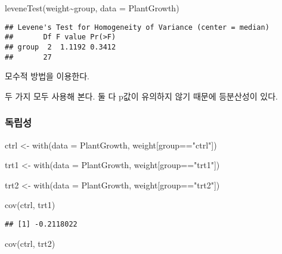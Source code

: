 \documentclass[
]{article}
\newenvironment{Shaded}{\begin{snugshade}}{\end{snugshade}}
\newcommand{\AttributeTok}[1]{\textcolor[rgb]{0.77,0.63,0.00}{#1}}
\newcommand{\FunctionTok}[1]{\textcolor[rgb]{0.00,0.00,0.00}{#1}}
\newcommand{\NormalTok}[1]{#1}
\newcommand{\OtherTok}[1]{\textcolor[rgb]{0.56,0.35,0.01}{#1}}
\newcommand{\SpecialCharTok}[1]{\textcolor[rgb]{0.00,0.00,0.00}{#1}}
\newcommand{\StringTok}[1]{\textcolor[rgb]{0.31,0.60,0.02}{#1}}
\begin{document}
\begin{Shaded}
\begin{Highlighting}[]
\FunctionTok{leveneTest}\NormalTok{(weight}\SpecialCharTok{\textasciitilde{}}\NormalTok{group, }\AttributeTok{data =}\NormalTok{ PlantGrowth)}
\end{Highlighting}
\end{Shaded}

\begin{verbatim}
## Levene's Test for Homogeneity of Variance (center = median)
##       Df F value Pr(>F)
## group  2  1.1192 0.3412
##       27
\end{verbatim}

모수적 방법을 이용한다.

두 가지 모두 사용해 본다. 둘 다 p값이 유의하지 않기 때문에 등분산성이 있다.

\hypertarget{uxb3c5uxb9bduxc131}{%
\subsubsection{독립성}\label{uxb3c5uxb9bduxc131}}

\begin{Shaded}
\begin{Highlighting}[]
\NormalTok{ctrl }\OtherTok{\textless{}{-}} \FunctionTok{with}\NormalTok{(}\AttributeTok{data =}\NormalTok{ PlantGrowth, weight[group}\SpecialCharTok{==}\StringTok{"ctrl"}\NormalTok{])}

\NormalTok{trt1 }\OtherTok{\textless{}{-}} \FunctionTok{with}\NormalTok{(}\AttributeTok{data =}\NormalTok{ PlantGrowth, weight[group}\SpecialCharTok{==}\StringTok{"trt1"}\NormalTok{])}

\NormalTok{trt2 }\OtherTok{\textless{}{-}} \FunctionTok{with}\NormalTok{(}\AttributeTok{data =}\NormalTok{ PlantGrowth, weight[group}\SpecialCharTok{==}\StringTok{"trt2"}\NormalTok{])}

\FunctionTok{cov}\NormalTok{(ctrl, trt1)}
\end{Highlighting}
\end{Shaded}

\begin{verbatim}
## [1] -0.2118022
\end{verbatim}

\begin{Shaded}
\begin{Highlighting}[]
\FunctionTok{cov}\NormalTok{(ctrl, trt2)}
\end{Highlighting}
\end{Shaded}
\end{document}
